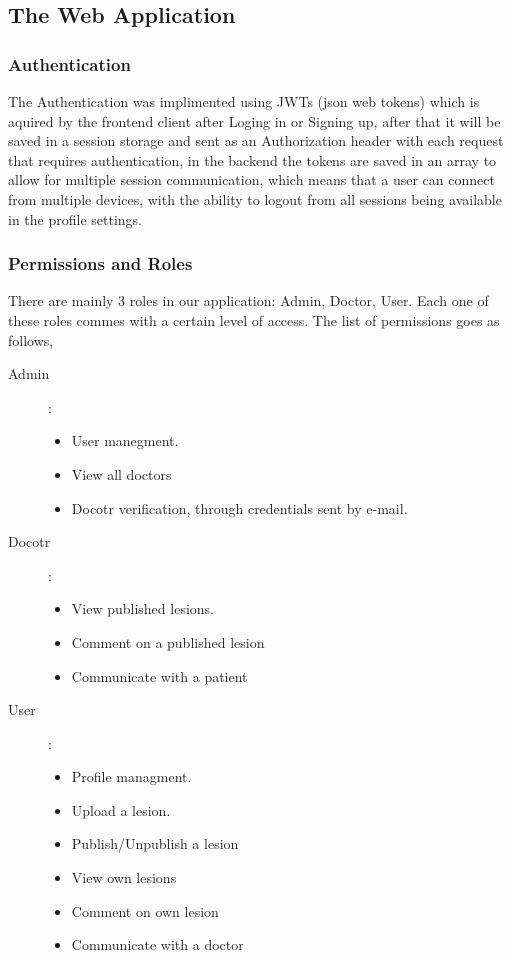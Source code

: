 \subsection{The Web Application}
    \subsubsection{Authentication}
        The Authentication was implimented using JWTs (json web tokens) which is aquired by the frontend client after Loging in or Signing up, after that it will be saved in a session storage and sent as an Authorization header with each request that requires authentication, in the backend the tokens are saved in an array to allow for multiple session communication, which means that a user can connect from multiple devices, with the ability to logout from all sessions being available in the profile settings.
    
    \subsubsection{Permissions and Roles}
        There are mainly 3 roles in our application: Admin, Doctor, User. Each one of these roles commes with a certain level of access. The list of permissions goes as follows, 

        \begin{description}
            \item[Admin]:\\
            \begin{itemize}
                \item User manegment.
                \item View all doctors
                \item Docotr verification, through credentials sent by e-mail.
            \end{itemize}
            \item[Docotr]:\\
            \begin{itemize}
                \item View published lesions.
                \item Comment on a published lesion
                \item Communicate with a patient
            \end{itemize}
            \item[User]:\\
            \begin{itemize}
                \item Profile managment.
                \item Upload a lesion.
                \item Publish/Unpublish a lesion
                \item View own lesions
                \item Comment  on own lesion
                \item Communicate with a doctor 
            \end{itemize}
        \end{description}
    
